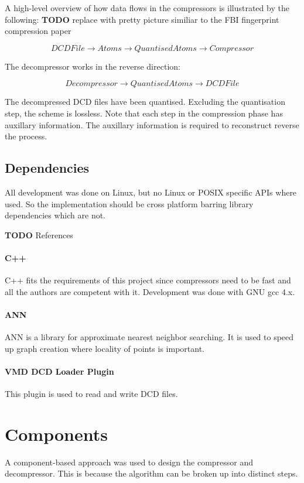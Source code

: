 \documentclass{report}
\newcommand{\todo}{\textbf{TODO} }
\begin{document}
A high-level overview of how data flows in the compressors is illustrated by
the following: \todo replace with pretty picture similiar to the FBI
fingerprint compression paper

\[ DCDFile \to Atoms \to QuantisedAtoms \to Compressor \]

The decompressor works in the reverse direction:

\[ Decompressor \to QuantisedAtoms \to DCDFile \]

The decompressed DCD files have been quantised. Excluding the quantisation
step, the scheme is lossless. Note that each step in the compression phase has
auxillary information. The auxillary information is required to reconstruct
reverse the process.


\subsection{Dependencies}

All development was done on Linux, but no Linux or POSIX specific APIs where
used. So the implementation should be cross platform barring library
dependencies which are not.

\todo References

\paragraph{C++}
C++ fits the requirements of this project since compressors need to be fast
and all the authors are competent with it. Development was done with GNU gcc
4.x.

\paragraph{ANN}
ANN is a library for approximate nearest neighbor searching. It is used to
speed up graph creation where locality of points is important.

\paragraph{VMD DCD Loader Plugin}
This plugin is used to read and write DCD files.


\section{Components}

A component-based approach was used to design the compressor and
decompressor. This is because the algorithm can be broken up into distinct
steps.
\end{document}
